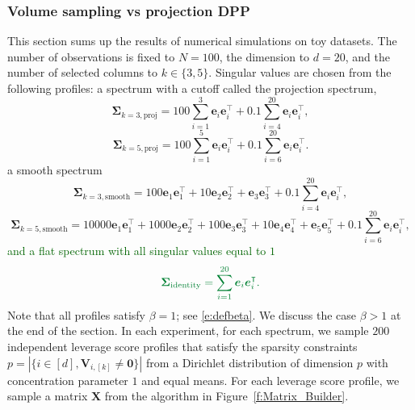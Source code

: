\documentclass[twoside,11pt]{book}
\newcommand{\rev}[1]{\textcolor{darkgreen}{#1}}
\numberwithin{theorem}{chapter}
\numberwithin{definition}{chapter}
\numberwithin{proposition}{chapter}
\numberwithin{corollary}{chapter}
\numberwithin{example}{chapter}
\numberwithin{lemma}{chapter}
\DeclareMathOperator{\Tran}{\intercal}
\begin{document}
\subsubsection{Volume sampling vs projection DPP}
This section sums up the results of numerical simulations on toy datasets. The number of observations is fixed to $N =100 $, the dimension to $d = 20$, and the number of selected columns to $k \in \{3,5\}$. Singular values are chosen from the following profiles: a spectrum with a cutoff called the projection spectrum,
$$
	\bm{\Sigma}_{k=3,\text{proj}} = 100 \sum\limits_{i = 1}^{3} \bm{e}_{i}\bm{e}_{i}^{\Tran} + 0.1 \sum\limits_{i = 4}^{20} \bm{e}_{i}\bm{e}_{i}^{\Tran}, $$
$$
	\bm{\Sigma}_{k=5,\text{proj}} = 100 \sum\limits_{i = 1}^{5} \bm{e}_{i}\bm{e}_{i}^{\Tran} + 0.1 \sum\limits_{i = 6}^{20} \bm{e}_{i}\bm{e}_{i}^{\Tran}. $$
a smooth spectrum
$$
	\bm{\Sigma}_{k=3,\text{smooth}} = 100\bm{e}_{1}\bm{e}_{1}^{\Tran} + 10\bm{e}_{2}\bm{e}_{2}^{\Tran} + \bm{e}_{3}\bm{e}_{3}^{\Tran} + 0.1 \sum\limits_{i = 4}^{20} \bm{e}_{i}\bm{e}_{i}^{\Tran},$$
$$
	\bm{\Sigma}_{k=5,\text{smooth}} = 10000\bm{e}_{1}\bm{e}_{1}^{\Tran} + 1000\bm{e}_{2}\bm{e}_{2}^{\Tran} + 100\bm{e}_{3}\bm{e}_{3}^{\Tran} +  10\bm{e}_{4}\bm{e}_{4}^{\Tran} +  \bm{e}_{5}\bm{e}_{5}^{\Tran} + 0.1 \sum\limits_{i = 6}^{20} \bm{e}_{i}\bm{e}_{i}^{\Tran},
	$$
\rev{and a flat spectrum with all singular values equal to $1$}
$$
\rev{    \bm{\Sigma}_{\text{identity}} = \sum\limits_{i = 1}^{20} \bm{e}_{i}\bm{e}_{i}^{\Tran}.}
    $$
Note that all profiles satisfy $\beta=1$; see \eqref{e:defbeta}. We discuss the case $\beta > 1$ at the end of the section. In each experiment, for each spectrum, we sample $200$ independent leverage score profiles that satisfy the sparsity constraints $p = \left| \{i \in [d], \bm{V}_{i,[k]} \neq \bm{0}\}\right|$ from a Dirichlet distribution of dimension $p$ with concentration parameter $1$ and equal means. For each leverage score profile, we sample a matrix $\bm{X}$ from the algorithm in Figure~\ref{f:Matrix_Builder}.
\end{document}
